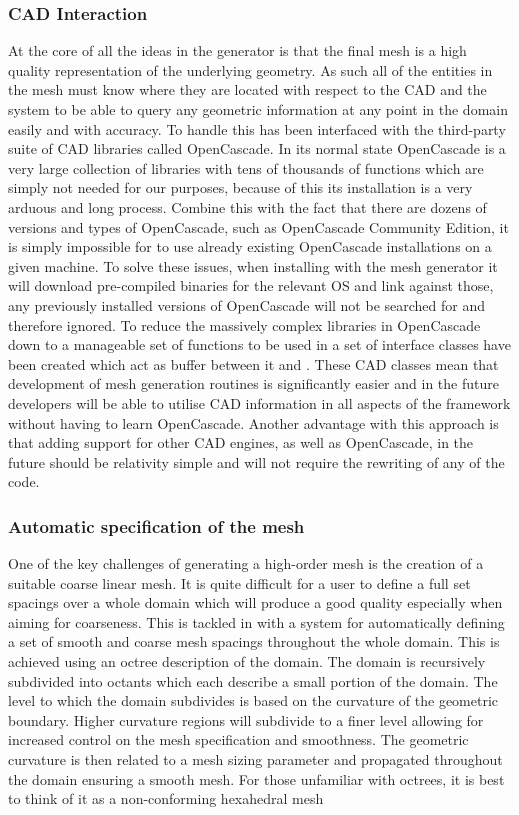 \subsubsection{CAD Interaction}

At the core of all the ideas in the \nm generator is that the final mesh is a
high quality representation of the underlying geometry. As such all of the
entities in the mesh must know where they are located with respect to the CAD
and the system to be able to query any geometric information at any point in the
domain easily and with accuracy. To handle this \nm has been interfaced with the
third-party suite of CAD libraries called OpenCascade. In its normal state
OpenCascade is a very large collection of libraries with tens of thousands of
functions which are simply not needed for our purposes, because of this its
installation is a very arduous and long process. Combine this with the fact that
there are dozens of versions and types of OpenCascade, such as OpenCascade
Community Edition, it is simply impossible for \nm to use already existing
OpenCascade installations on a given machine. To solve these issues, when
installing \nekpp with the mesh generator it will download pre-compiled binaries
for the relevant OS and link against those, any previously installed versions of
OpenCascade will not be searched for and therefore ignored.
%
To reduce the massively complex libraries in OpenCascade down to a manageable
set of functions to be used in \nm a set of interface classes have been created
which act as buffer between it and \nekpp. These CAD classes mean that
development of mesh generation routines is significantly easier and in the
future \nekpp developers will be able to utilise CAD information in all aspects
of the framework without having to learn OpenCascade. Another advantage with
this approach is that adding support for other CAD engines, as well as
OpenCascade, in the future should be relativity simple and will not require the
rewriting of any of the \nm code.

\subsubsection{Automatic specification of the mesh}

One of the key challenges of generating a high-order mesh is the creation of a
suitable coarse linear mesh. It is
quite difficult for a user to define a full set spacings over a whole domain
which will produce a good quality especially when aiming for coarseness. This
is tackled in \nm with a system for automatically defining a
set of smooth and coarse mesh spacings throughout the whole domain. This is
achieved using an octree description of the domain. The domain is recursively
subdivided into octants which each describe a small portion of the domain. The
level to which the domain subdivides is based on the curvature of the geometric
boundary. Higher curvature regions will subdivide to a finer level allowing for
increased control on the mesh specification and smoothness. The geometric
curvature is then related to a mesh sizing parameter and propagated throughout
the domain ensuring a smooth mesh. For those unfamiliar with octrees, it is
best to think of it as a non-conforming hexahedral mesh

